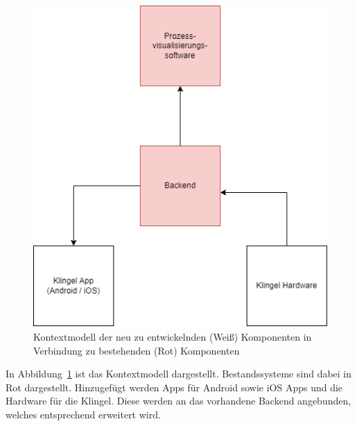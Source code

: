 \begin{figure}[ht!]
    \centering\includegraphics[width=\paperwidth/2]{../assets/img/kontextmodell}

    \caption{Kontextmodell der neu zu entwickelnden (Weiß) Komponenten in Verbindung zu bestehenden (Rot) Komponenten}
    \label{fig:kontextmodell}
\end{figure}
In Abbildung~\ref{fig:kontextmodell} ist das Kontextmodell dargestellt.
Bestandssysteme sind dabei in Rot dargestellt.
Hinzugefügt werden Apps für Android sowie iOS Apps und die Hardware für die Klingel.
Diese werden an das vorhandene Backend angebunden, welches entsprechend erweitert wird.